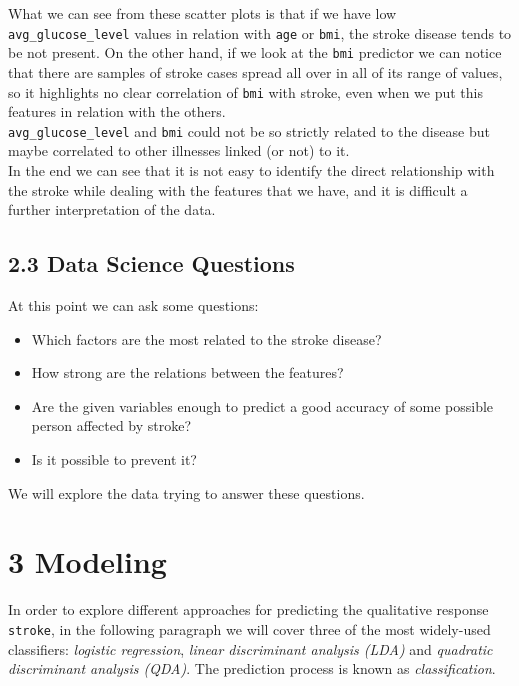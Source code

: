 \documentclass[
]{article}
\providecommand{\tightlist}{%
  \setlength{\itemsep}{0pt}\setlength{\parskip}{0pt}}
\begin{document}
What we can see from these scatter plots is that if we have low
\texttt{avg\_glucose\_level} values in relation with \texttt{age} or
\texttt{bmi}, the stroke disease tends to be not present. On the other
hand, if we look at the \texttt{bmi} predictor we can notice that there
are samples of stroke cases spread all over in all of its range of
values, so it highlights no clear correlation of \texttt{bmi} with
stroke, even when we put this features in relation with the others.\\
\texttt{avg\_glucose\_level} and \texttt{bmi} could not be so strictly
related to the disease but maybe correlated to other illnesses linked
(or not) to it.\\
In the end we can see that it is not easy to identify the direct
relationship with the stroke while dealing with the features that we
have, and it is difficult a further interpretation of the data.

\hypertarget{data-science-questions}{%
\subsection{2.3 Data Science Questions}\label{data-science-questions}}

At this point we can ask some questions:

\begin{itemize}
\tightlist
\item
  Which factors are the most related to the stroke disease?
\item
  How strong are the relations between the features?
\item
  Are the given variables enough to predict a good accuracy of some
  possible person affected by stroke?
\item
  Is it possible to prevent it?
\end{itemize}

We will explore the data trying to answer these questions.

\hypertarget{modeling}{%
\section{3 Modeling}\label{modeling}}

In order to explore different approaches for predicting the qualitative
response \texttt{stroke}, in the following paragraph we will cover three
of the most widely-used classifiers: \emph{logistic regression},
\emph{linear discriminant analysis (LDA)} and \emph{quadratic
discriminant analysis (QDA)}. The prediction process is known as
\emph{classification}.
\end{document}
